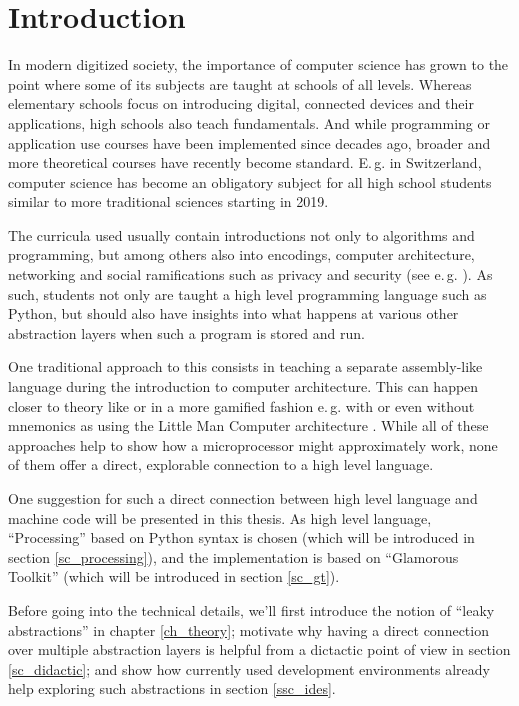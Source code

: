 
\chapter{Introduction}

In modern digitized society, the importance of computer science has grown to the point where some of its subjects are taught at schools of all levels. Whereas elementary schools focus on introducing digital, connected devices and their applications, high schools also teach fundamentals. And while programming or application use courses have been implemented since decades ago, broader and more theoretical courses have recently become standard. E.\,g. in Switzerland, computer science has become an obligatory subject for all high school students similar to more traditional sciences starting in 2019.

The curricula used usually contain introductions not only to algorithms and programming, but among others also into encodings, computer architecture, networking and social ramifications such as privacy and security (see e.\,g. \cite{Erz16}). As such, students not only are taught a high level programming language such as Python, but should also have insights into what happens at various other abstraction layers when such a program is stored and run.

One traditional approach to this consists in teaching a separate assembly-like language during the introduction to computer architecture. This can happen closer to theory like \cite{Gan23} or in a more gamified fashion e.\,g. with \cite{Tom15} or even without mnemonics as using the Little Man Computer architecture \cite{Oin25}. While all of these approaches help to show how a microprocessor might approximately work, none of them offer a direct, explorable connection to a high level language.

One suggestion for such a direct connection between high level language and machine code will be presented in this thesis. As high level language, ``Processing'' based on Python syntax is chosen (which will be introduced in section \ref{sc_processing}), and the implementation is based on ``Glamorous Toolkit'' (which will be introduced in section \ref{sc_gt}).

Before going into the technical details, we'll first introduce the notion of ``leaky abstractions'' in chapter \ref{ch_theory}; motivate why having a direct connection over multiple abstraction layers is helpful from a dictactic point of view in section \ref{sc_didactic}; and show how currently used development environments already help exploring such abstractions in section \ref{ssc_ides}.

